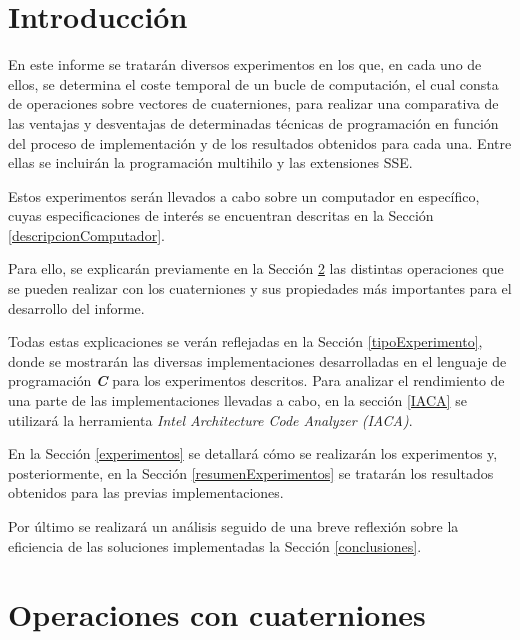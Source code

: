 \documentclass[conference]{IEEEtran}
\begin{document}

\section{Introducción}

En este informe se tratarán diversos experimentos en los que, en cada uno de ellos, se determina el coste temporal de un bucle de computación, el cual consta de operaciones sobre vectores de cuaterniones, para realizar una comparativa de las ventajas y desventajas de determinadas técnicas de programación en función del proceso de implementación y de los resultados obtenidos para cada una. Entre ellas se incluirán la programación multihilo y las extensiones SSE.

Estos experimentos serán llevados a cabo sobre un computador en específico, cuyas especificaciones de interés se encuentran descritas en la Sección \ref{descripcionComputador}.

Para ello, se explicarán previamente en la Sección \ref{descripcionMultiplicacionCuaterniones} las distintas operaciones que se pueden realizar con los cuaterniones y sus propiedades más importantes para el desarrollo del informe.

Todas estas explicaciones se verán reflejadas en la Sección \ref{tipoExperimento}, donde se mostrarán las diversas implementaciones desarrolladas en el lenguaje de programación \textit{\textbf{C}} para los experimentos descritos. Para analizar el rendimiento de una parte de las implementaciones llevadas a cabo, en la sección \ref{IACA} se utilizará la herramienta \textit{Intel Architecture Code Analyzer (IACA)}.

En la Sección \ref{experimentos} se detallará cómo se realizarán los experimentos y, posteriormente, en la Sección \ref{resumenExperimentos} se tratarán los resultados obtenidos para las previas implementaciones.

Por último se realizará un análisis seguido de una breve reflexión sobre la eficiencia de las soluciones implementadas la Sección \ref{conclusiones}.

\section{Operaciones con cuaterniones} \label{descripcionMultiplicacionCuaterniones}
\end{document}
